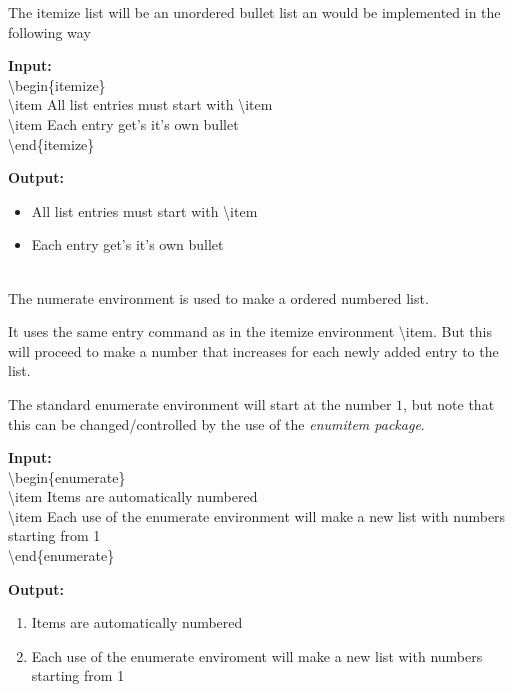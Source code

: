 \documentclass{article}
\newcommand{\bs}[1]{\textbackslash{}#1} %
\begin{document}
The itemize list will be an unordered bullet list an would be implemented in the 
following way
\begin{multicols}{2}
    \begin{minipage}{\linewidth}
        \textbf{Input:} \\
        \bs{begin\{itemize\}} \\
        \bs{item} All list entries must start with \bs{item} \\
        \bs{item} Each entry get's it's own bullet \\
        \bs{end\{itemize\}}
    \end{minipage}
    
    \begin{minipage}{\linewidth}
        \textbf{Output: } \\
        \begin{itemize}
            \item All list entries must start with \bs{item}
            \item Each entry get's it's own bullet
        \end{itemize}
    \end{minipage}
\end{multicols}

 \\
\indent The numerate environment is used to make a ordered numbered list.

It uses the same entry command as in the itemize environment \bs{item}. But 
this will proceed to make a number that increases for each newly added entry
to the list.

The standard enumerate environment will start at the number $1$, but note that 
this can be changed/controlled by the use of the \textit{enumitem package}.

\begin{multicols}{2}
    \begin{minipage}{\linewidth}
        \textbf{Input:} \\
        \bs{begin\{enumerate\}} \\
        \bs{item} Items are automatically numbered \\
        \bs{item} Each use of the enumerate environment will make a new list 
                    with numbers starting from 1 \\
        \bs{end\{enumerate\}}
    \end{minipage}

    \begin{minipage}{\linewidth}
        \textbf{Output:} \\
        \begin{enumerate}
            \item Items are automatically numbered
            \item Each use of the enumerate enviroment will make a new list  
                    with numbers starting from 1
        \end{enumerate}
    \end{minipage}
\end{multicols}
\end{document}
